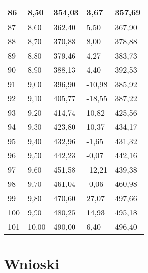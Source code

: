 \documentclass{article}
\begin{document}
\begin{longtable}{|l|l|l|l|l|}
    86 & 8,50 & 354,03 & 3,67 & 357,69 \\ \hline
    87 & 8,60 & 362,40 & 5,50 & 367,90 \\ \hline
    88 & 8,70 & 370,88 & 8,00 & 378,88 \\ \hline
    89 & 8,80 & 379,46 & 4,27 & 383,73 \\ \hline
    90 & 8,90 & 388,13 & 4,40 & 392,53 \\ \hline
    91 & 9,00 & 396,90 & -10,98 & 385,92 \\ \hline
    92 & 9,10 & 405,77 & -18,55 & 387,22 \\ \hline
    93 & 9,20 & 414,74 & 10,82 & 425,56 \\ \hline
    94 & 9,30 & 423,80 & 10,37 & 434,17 \\ \hline
    95 & 9,40 & 432,96 & -1,65 & 431,32 \\ \hline
    96 & 9,50 & 442,23 & -0,07 & 442,16 \\ \hline
    97 & 9,60 & 451,58 & -12,21 & 439,38 \\ \hline
    98 & 9,70 & 461,04 & -0,06 & 460,98 \\ \hline
    99 & 9,80 & 470,60 & 27,07 & 497,66 \\ \hline
    100 & 9,90 & 480,25 & 14,93 & 495,18 \\ \hline
    101 & 10,00 & 490,00 & 6,40 & 496,40 \\ \hline
\end{longtable}




\section{Wnioski}
\end{document}
